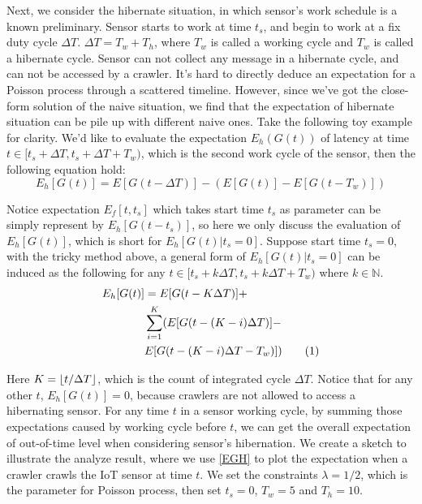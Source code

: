 \documentclass[conference]{IEEEtran}
\newcommand\numberthis{\addtocounter{equation}{1}\tag{\theequation}}
\DeclarePairedDelimiter\floor{\lfloor}{\rfloor}
\begin{document}
Next, we consider the hibernate situation, in which sensor's work schedule is a known preliminary. Sensor starts to work at time $t_s$, and begin to work at a fix duty cycle \(\Delta T\). \(\Delta T = T_w+T_h\), where \(T_w\) is called a working cycle and \(T_w\) is called a hibernate cycle. Sensor can not collect any message in a hibernate cycle, and can not be accessed by a crawler. It's hard to directly deduce an expectation for a Poisson process through a scattered timeline. 
However, since we've got the close-form solution of the naive situation, we find that the expectation of hibernate situation can be pile up with different naive ones. Take the following toy example for clarity.
We'd like to evaluate the expectation \(E_h(G(t))\) of latency at time \(t \in [t_s+\Delta T, t_s+\Delta T+T_w)\), which is the second work cycle of the sensor, then the following equation hold:
\[
E_h[G(t)] = E[G(t-\Delta T)] - (E[G(t)]-E[G(t-T_w)])
\]

Notice expectation $E_f[t, t_s]$ which takes start time $t_s$ as parameter can be simply represent by $E_h[G(t-t_s)]$, so here we only discuss the evaluation of $E_h[G(t)]$, which is short for $E_h[G(t)|t_s=0]$. Suppose start time $t_s=0$, with the tricky method above, a general form of \(E_h[G(t)|t_s=0]\) can be induced as the following for any \(t \in [t_s+k \Delta T, t_s+k\Delta T+T_w)\) where \(k\in\mathbb{N}\).
\begin{align*}
E_h[G(t)] &= E[G(t-K \Delta T)] + 
    \\&\sum_{i=1}^{K}(E[G(t-(K-i)\Delta T)]-
    \\&E[G(t-(K-i)\Delta T-T_w)]) \numberthis \label{EGH}
\end{align*}

Here \(K=\floor*{t/\Delta T}\), which is the count of integrated cycle \(\Delta T\). Notice that for any other \(t\), \(E_h[G(t)]=0\), because crawlers are not allowed to access a hibernating sensor. For any time \(t\) in a sensor working cycle, by summing those expectations caused by working cycle before \(t\), we can get the overall expectation of out-of-time level when considering sensor's hibernation. 
We create a sketch to illustrate the analyze result, where we use \eqref{EGH} to plot the expectation when a crawler crawls the IoT sensor at time \(t\). We set the constraints \(\lambda=1/2\), which is the parameter for Poisson process, then set \(t_s=0\), \(T_w=5\) and \(T_h=10\).

%
\end{document}

